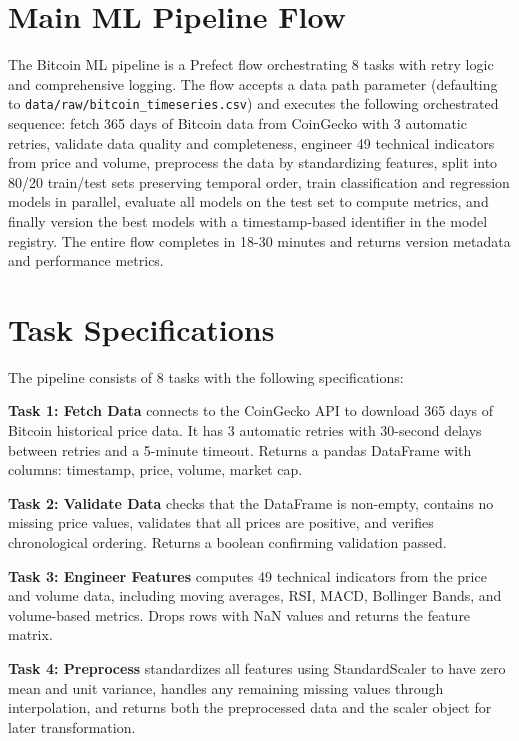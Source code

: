 \section{Main ML Pipeline Flow}

The Bitcoin ML pipeline is a Prefect flow orchestrating 8 tasks with retry logic and comprehensive logging. The flow accepts a data path parameter (defaulting to \texttt{data/raw/bitcoin\_timeseries.csv}) and executes the following orchestrated sequence: fetch 365 days of Bitcoin data from CoinGecko with 3 automatic retries, validate data quality and completeness, engineer 49 technical indicators from price and volume, preprocess the data by standardizing features, split into 80/20 train/test sets preserving temporal order, train classification and regression models in parallel, evaluate all models on the test set to compute metrics, and finally version the best models with a timestamp-based identifier in the model registry. The entire flow completes in 18-30 minutes and returns version metadata and performance metrics.

\section{Task Specifications}

The pipeline consists of 8 tasks with the following specifications:

\textbf{Task 1: Fetch Data} connects to the CoinGecko API to download 365 days of Bitcoin historical price data. It has 3 automatic retries with 30-second delays between retries and a 5-minute timeout. Returns a pandas DataFrame with columns: timestamp, price, volume, market cap.

\textbf{Task 2: Validate Data} checks that the DataFrame is non-empty, contains no missing price values, validates that all prices are positive, and verifies chronological ordering. Returns a boolean confirming validation passed.

\textbf{Task 3: Engineer Features} computes 49 technical indicators from the price and volume data, including moving averages, RSI, MACD, Bollinger Bands, and volume-based metrics. Drops rows with NaN values and returns the feature matrix.

\textbf{Task 4: Preprocess} standardizes all features using StandardScaler to have zero mean and unit variance, handles any remaining missing values through interpolation, and returns both the preprocessed data and the scaler object for later transformation.

